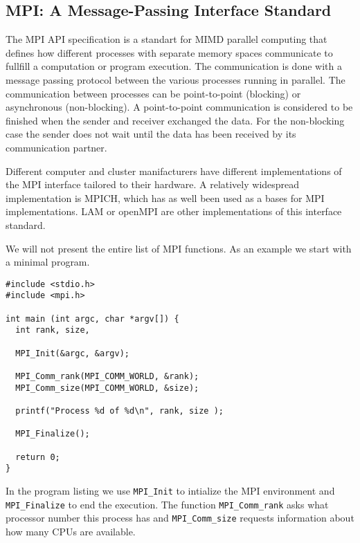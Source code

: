 \documentclass{article}
\begin{document}
\begin{comment}
\begin{figure}[p]
\texttt{[image: parallel\_algo\_flowchart.pdf]}
\caption{XXX Explain chart! \label{fig:parallel_algo_flowchart} }
\end{figure}
\end{comment}

\subsection{MPI: A Message-Passing Interface Standard}

The MPI API specification is a standart for MIMD parallel computing
that defines how different processes with separate memory spaces
communicate to fullfill a computation or program execution. The
communication is done with a message passing protocol between the
various processes running in parallel. The communication between
processes can be point-to-point (blocking) or asynchronous (non-blocking).
A point-to-point communication is considered to be finished when
the sender and receiver exchanged the data. For the non-blocking
case the sender does not wait until the data has been received
by its communication partner.

Different computer and cluster manifacturers have different
implementations of the MPI interface tailored to their hardware.
A relatively widespread implementation is MPICH, which has
as well been used as a bases for MPI implementations.
LAM or openMPI are other implementations of this interface standard.

We will not present the entire list of MPI functions. As an example
we start with a minimal program.

\begin{verbatim}
#include <stdio.h>
#include <mpi.h>

int main (int argc, char *argv[]) {
  int rank, size, 

  MPI_Init(&argc, &argv);

  MPI_Comm_rank(MPI_COMM_WORLD, &rank);
  MPI_Comm_size(MPI_COMM_WORLD, &size);

  printf("Process %d of %d\n", rank, size );

  MPI_Finalize();

  return 0;
}
\end{verbatim}

In the program listing we use \verb+MPI_Init+ to intialize
the MPI environment and \verb+MPI_Finalize+ to end the
execution. The function \verb+MPI_Comm_rank+ asks what
processor number this process has and
\verb+MPI_Comm_size+ requests information about how many
CPUs are available. 
\end{document}
